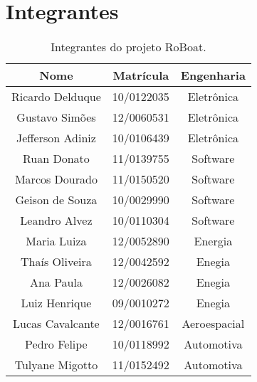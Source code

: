 \chapter*[Integrantes]{Integrantes}


\begin{table}[h]
	\centering
	\label{tab01}	
	\begin{tabular}{ccc}
		\toprule
		\textbf{Nome} & \textbf{Matrícula} & \textbf{Engenharia} \\
		\midrule
		Ricardo Delduque & 10/0122035 & Eletrônica          \\
		Gustavo Simões & 12/0060531 & Eletrônica             \\
		Jefferson Adiniz & 10/0106439 & Eletrônica                 \\
		Ruan Donato  & 11/0139755 & Software  \\
		Marcos Dourado & 11/0150520 & Software                       \\
		Geison de Souza & 10/0029990 & Software              \\
		Leandro Alvez & 10/0110304 & Software             \\
		Maria Luiza  & 12/0052890 & Energia             \\
		Thaís Oliveira  &12/0042592 & Enegia             \\	
		Ana Paula  & 12/0026082 & Enegia            \\
		Luiz Henrique  & 09/0010272& Enegia             \\
		Lucas Cavalcante  & 12/0016761 & Aeroespacial            \\	
		Pedro Felipe &10/0118992 & Automotiva             \\
		Tulyane Migotto  &11/0152492 & Automotiva             \\
		\bottomrule
	\end{tabular}	
	\caption{Integrantes do projeto RoBoat.}
\end{table}